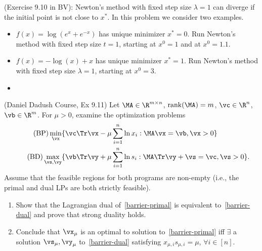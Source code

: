 \documentclass[addpoints,12pt,A4]{exam}
\begin{document}
\begin{questions}
\question (Exercise 9.10 in BV): Newton's method with fixed step size $\lambda=1$ can diverge if the
initial point is not close to $x^{*}$. In this problem we consider two examples. 
\begin{itemize}
\item[a.] $f(x) = \log(e^{x} + e^{-x})$ has unique minimizer $x^{*} = 0$. Run Newton's method with
fixed step size $t=1$, starting at $x^{0} = 1$ and at $x^{0} = 1.1$. 


\item[b.] $f(x) = - \log(x) + x$ has unique minimizer $x^{*} = 1$. Run Newton's method with fixed
step size $\lambda=1$, starting at $x^{0} = 3$. 
\end{itemize}
\begin{solution}
    \begin{itemize}
        \item 
    \end{itemize}
    
\end{solution}



\question (Daniel Dadush Course, Ex 9.11)
Let $\MA \in \R^{m \times n}$, ${\rm rank}(\MA)=m$, $\vc \in \R^n$, $\vb \in \R^m$. 
For $\mu > 0$, examine the optimization problems
\begin{align}
\tag{BP} \label{barrier-primal}
\min_{\vx} &\{\vc \Tr \vx - \mu \sum_{i=1}^n \ln x_i: \MA \vx = \vb, \vx > 0 \} \\
\tag{BD} \label{barrier-dual}
\max_{\vs,\vy} &\{\vb \Tr \vy + \mu \sum_{i=1}^n \ln s_i: \MA \Tr \vy + \vs = \vc, \vs > 0\}. 
\end{align}
Assume that the feasible regions for both programs are non-empty (i.e., the
primal and dual LPs are both strictly feasible).
\begin{enumerate}
\item Show that the Lagrangian dual of~\ref{barrier-primal} is equivalent
to~\ref{barrier-dual} and prove that strong duality holds.
\item Conclude that $\vx_\mu$ is an optimal to solution to~\eqref{barrier-primal}
iff $\exists$ a solution $\vs_\mu, \vy_\mu$ to~\eqref{barrier-dual}
satisfying $x_{\mu,i} s_{\mu,i} = \mu$, $\forall i \in [n]$.
\end{enumerate}
\begin{solution}
    
\end{solution}


    
\end{questions}
\end{document}
